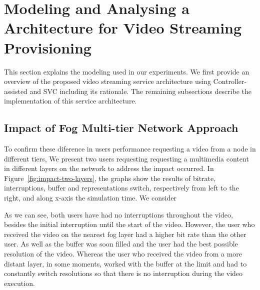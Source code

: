 \section{Modeling and Analysing a Architecture for Video Streaming Provisioning}
\label{sec:system-archi}


This section explains the modeling used in our experiments. We first provide an overview of the proposed video streaming service architecture using Controller-assisted and SVC including its rationale. The remaining subsections describe the implementation of this service architecture.

\subsection{Impact of Fog Multi-tier Network Approach}

To confirm these diference in users performance requesting a video from a node in different tiers, We present two users requesting requesting a multimedia content in different layers on the network to address the impact occurred. In Figure~\ref{fig:impact-two-layers}, the graphs show the results of bitrate, interruptions, buffer and representations switch, respectively from left to the right, and along x-axis the simulation time. We consider 

As we can see, both users have had no interruptions throughout the video, besides the initial interruption until the start of the video. However, the user who received the video on the nearest fog layer had a higher bit rate than the other user. As well as the buffer was soon filled and the user had the best possible resolution of the video. Whereas the user who received the video from a more distant layer, in some moments, worked with the buffer at the limit and had to constantly switch resolutions so that there is no interruption during the video execution.

